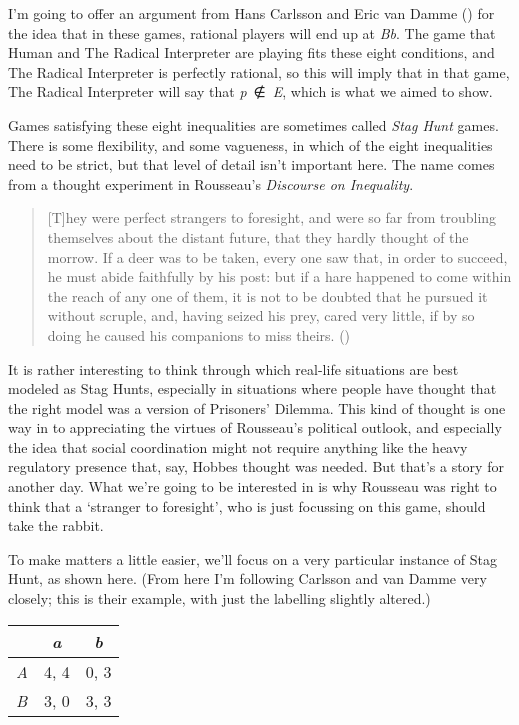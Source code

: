 \documentclass[
  10pt,
  letterpaper,
  DIV=11,
  numbers=noendperiod,
  twoside]{scrartcl}
\begin{document}
I'm going to offer an argument from Hans Carlsson and Eric van Damme
() for the idea that in these
games, rational players will end up at \emph{Bb}. The game that Human
and The Radical Interpreter are playing fits these eight conditions, and
The Radical Interpreter is perfectly rational, so this will imply that
in that game, The Radical Interpreter will say that \emph{p}~∉~\emph{E},
which is what we aimed to show.

Games satisfying these eight inequalities are sometimes called
\emph{Stag Hunt} games. There is some flexibility, and some vagueness,
in which of the eight inequalities need to be strict, but that level of
detail isn't important here. The name comes from a thought experiment in
Rousseau's \emph{Discourse on Inequality}.

\begin{quote}
{[}T{]}hey were perfect strangers to foresight, and were so far from
troubling themselves about the distant future, that they hardly thought
of the morrow. If a deer was to be taken, every one saw that, in order
to succeed, he must abide faithfully by his post: but if a hare happened
to come within the reach of any one of them, it is not to be doubted
that he pursued it without scruple, and, having seized his prey, cared
very little, if by so doing he caused his companions to miss theirs.
()
\end{quote}

It is rather interesting to think through which real-life situations are
best modeled as Stag Hunts, especially in situations where people have
thought that the right model was a version of Prisoners' Dilemma. This
kind of thought is one way in to appreciating the virtues of Rousseau's
political outlook, and especially the idea that social coordination
might not require anything like the heavy regulatory presence that, say,
Hobbes thought was needed. But that's a story for another day. What
we're going to be interested in is why Rousseau was right to think that
a `stranger to foresight', who is just focussing on this game, should
take the rabbit.

To make matters a little easier, we'll focus on a very particular
instance of Stag Hunt, as shown here. (From here I'm following Carlsson
and van Damme very closely; this is their example, with just the
labelling slightly altered.)

\begin{longtable}[]{@{}lcc@{}}
\toprule\noalign{}
& \emph{a} & \emph{b} \\
\midrule\noalign{}
\endhead
\bottomrule\noalign{}
\endlastfoot
\emph{A} & 4, 4 & 0, 3 \\
\emph{B} & 3, 0 & 3, 3 \\
\end{longtable}
\end{document}
